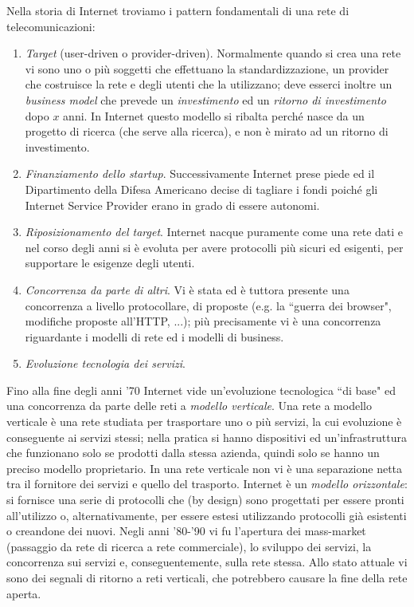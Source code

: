 \noindent Nella storia di Internet troviamo i pattern fondamentali di una rete di telecomunicazioni:
\begin{enumerate}
	\item \textit{Target} (user-driven o provider-driven). Normalmente quando si crea una rete vi sono uno o più soggetti che effettuano la standardizzazione, un provider che costruisce la rete e degli utenti che la utilizzano; deve esserci inoltre un \textit{business model} che prevede un \textit{investimento} ed un \textit{ritorno di investimento} dopo $x$ anni. In Internet questo modello si ribalta perché nasce da un progetto di ricerca (che serve alla ricerca), e non è mirato ad un ritorno di investimento.
	\item \textit{Finanziamento dello startup}. Successivamente Internet prese piede ed il Dipartimento della Difesa Americano decise di tagliare i fondi poiché gli Internet Service Provider erano in grado di essere autonomi.
	\item \textit{Riposizionamento del target}. Internet nacque puramente come una rete dati e nel corso degli anni si è evoluta per avere protocolli più sicuri ed esigenti, per supportare le esigenze degli utenti.
	\item \textit{Concorrenza da parte di altri}. Vi è stata ed è tuttora presente una concorrenza a livello protocollare, di proposte (e.g. la \textquotedblleft guerra dei browser", modifiche proposte all'HTTP, ...); più precisamente vi è una concorrenza riguardante i modelli di rete ed i modelli di business.
	\item \textit{Evoluzione tecnologia dei servizi}.
\end{enumerate}
Fino alla fine degli anni '70 Internet vide un'evoluzione tecnologica \textquotedblleft di base" ed una concorrenza da parte delle reti a \textit{modello verticale}. Una rete a modello verticale è una rete studiata per trasportare uno o più servizi, la cui evoluzione è conseguente ai servizi stessi; nella pratica si hanno dispositivi ed un'infrastruttura che funzionano solo se prodotti dalla stessa azienda, quindi solo se hanno un preciso modello proprietario. In una rete verticale non vi è una separazione netta tra il fornitore dei servizi e quello del trasporto. Internet è un \textit{modello orizzontale}: si fornisce una serie di protocolli che (by design) sono progettati per essere pronti all'utilizzo o, alternativamente, per essere estesi utilizzando protocolli già esistenti o creandone dei nuovi. Negli anni '80-'90 vi fu l'apertura dei mass-market (passaggio da rete di ricerca a rete commerciale), lo sviluppo dei servizi, la concorrenza sui servizi e, conseguentemente, sulla rete stessa. Allo stato attuale vi sono dei segnali di ritorno a reti verticali, che potrebbero causare la fine della rete aperta.

